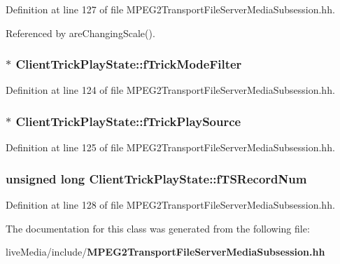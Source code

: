 Definition at line 127 of file M\+P\+E\+G2\+Transport\+File\+Server\+Media\+Subsession.\+hh.



Referenced by are\+Changing\+Scale().

\subsubsection[{f\+Trick\+Mode\+Filter}]{$\ast$ Client\+Trick\+Play\+State\+::f\+Trick\+Mode\+Filter\hspace{0.3cm}{\ttfamily [protected]}}\label{classClientTrickPlayState_a3f39ce0fe61c61c0e63c335abc1f617c}


Definition at line 124 of file M\+P\+E\+G2\+Transport\+File\+Server\+Media\+Subsession.\+hh.

\subsubsection[{f\+Trick\+Play\+Source}]{$\ast$ Client\+Trick\+Play\+State\+::f\+Trick\+Play\+Source\hspace{0.3cm}{\ttfamily [protected]}}\label{classClientTrickPlayState_ad38e396094b3d931d1d03b8a28a38b4c}


Definition at line 125 of file M\+P\+E\+G2\+Transport\+File\+Server\+Media\+Subsession.\+hh.

\subsubsection[{f\+T\+S\+Record\+Num}]{\setlength{\rightskip}{0pt plus 5cm}unsigned long Client\+Trick\+Play\+State\+::f\+T\+S\+Record\+Num\hspace{0.3cm}{\ttfamily [protected]}}\label{classClientTrickPlayState_a06f9b7c634a33b67d1c42d5affa01ce1}


Definition at line 128 of file M\+P\+E\+G2\+Transport\+File\+Server\+Media\+Subsession.\+hh.



The documentation for this class was generated from the following file\+:\begin{DoxyCompactItemize}
\item 
live\+Media/include/{\bf M\+P\+E\+G2\+Transport\+File\+Server\+Media\+Subsession.\+hh}\end{DoxyCompactItemize}
